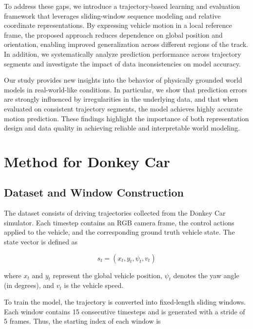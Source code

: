 \documentclass[preprint,12pt]{elsarticle}
\begin{document}
To address these gaps, we introduce a trajectory-based learning and evaluation framework that leverages sliding-window sequence modeling and relative coordinate representations. By expressing vehicle motion in a local reference frame, the proposed approach reduces dependence on global position and orientation, enabling improved generalization across different regions of the track. In addition, we systematically analyze prediction performance across trajectory segments and investigate the impact of data inconsistencies on model accuracy.

Our study provides new insights into the behavior of physically grounded world models in real-world-like conditions. In particular, we show that prediction errors are strongly influenced by irregularities in the underlying data, and that when evaluated on consistent trajectory segments, the model achieves highly accurate motion prediction. These findings highlight the importance of both representation design and data quality in achieving reliable and interpretable world modeling.

 






\section{Method for Donkey Car}
\label{sec1}
\subsection{Dataset and Window Construction}

The dataset consists of driving trajectories collected from the Donkey Car simulator.  Each timestep contains an RGB camera frame, the control actions applied to the vehicle, and the corresponding ground truth vehicle state. The state vector is defined as

\begin{equation}
s_t = (x_t, y_t, \psi_t, v_t)
\end{equation}

where $x_t$ and $y_t$ represent the global vehicle position, $\psi_t$ denotes the yaw angle (in degrees), and $v_t$ is the vehicle speed.

To train the model, the trajectory is converted into fixed-length sliding windows. Each window contains 15 consecutive timesteps and is generated with a stride of 5 frames.  Thus, the starting index of each window is
\end{document}
